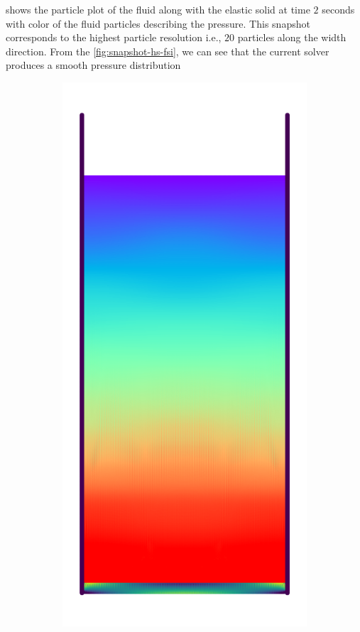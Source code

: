  shows the particle plot of the fluid along with the
elastic solid at time $2$ seconds with color of the fluid particles describing
the pressure. This snapshot corresponds to the highest particle resolution i.e.,
$20$ particles along the width direction. From the \cref{fig:snapshot-hs-fsi},
we can see that the current solver produces a smooth pressure distribution
\begin{figure}[!htpb]
  \centering
  \begin{subfigure}{0.48\textwidth}
    \centering
    \includegraphics[scale=1.0]{figures/fsi/figures/ng_2020_hydrostatic_water_column_on_elastic_plate/snap_t_0}

\end{subfigure}
\end{figure}

